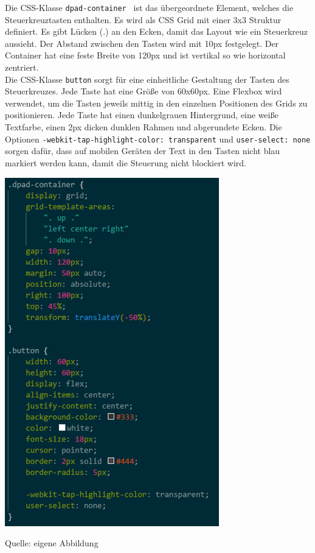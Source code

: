 \documentclass[ngerman,12pt,a4paper]{article}
\begin{document}
	Die CSS-Klasse \texttt{dpad-container } ist das übergeordnete Element, welches die Steuerkreuztasten enthalten. Es wird als CSS Grid mit einer 3x3 Struktur definiert. Es gibt Lücken (.) an den Ecken, damit das Layout wie ein Steuerkreuz aussieht. Der Abstand zwischen den Tasten wird mit 10px festgelegt. Der Container hat eine feste Breite von 120px und ist vertikal so wie horizontal zentriert. \\[0.5cm]
	Die CSS-Klasse \texttt{button} sorgt für eine einheitliche Gestaltung der Tasten des Steuerkreuzes. Jede Taste hat eine Größe von 60x60px. Eine Flexbox wird verwendet, um die Tasten jeweils mittig in den einzelnen Positionen des Grids zu positionieren. Jede Taste hat einen dunkelgrauen Hintergrund, eine weiße Textfarbe, einen 2px dicken dunklen Rahmen und abgerundete Ecken. Die Optionen \texttt{-webkit-tap-highlight-color: transparent} und \texttt{user-select: none} sorgen dafür, dass auf mobilen Geräten der Text in den Tasten nicht blau markiert werden kann, damit die Steuerung nicht blockiert wird. 
	\begin{center}
		\begin{minipage}[t]{0.6\textwidth}
			\includegraphics{Pictures/Steuerung-css1}
			\label{fig:Steuerkreuz-css1}
			\vspace{-10pt}
			\begin{center}
				\par\small Quelle: eigene Abbildung 
			\end{center}
		\end{minipage} \\[0.75cm]
	\end{center}
\end{document}
